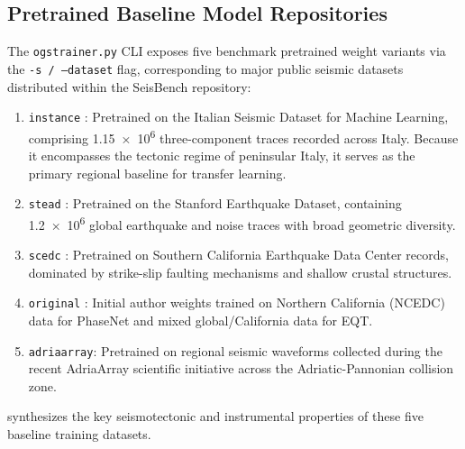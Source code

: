 \subsection{Pretrained Baseline Model Repositories}
\label{subsec:pretrained_repositories}

The \texttt{ogstrainer.py} CLI exposes five benchmark pretrained
weight variants
via the \texttt{-s / --dataset} flag, corresponding to major public seismic
datasets distributed within the SeisBench repository:
\begin{enumerate}
  \item \texttt{instance} \parencite{INSTANCE}: Pretrained on the
    Italian Seismic
    Dataset for Machine Learning, comprising \num{1.15e6} three-component
    traces recorded across Italy. Because it encompasses the tectonic regime of
    peninsular Italy, it serves as the primary regional baseline for
    transfer learning.
  \item \texttt{stead} \parencite{STEAD}: Pretrained on the Stanford Earthquake
    Dataset, containing \num{1.2e6} global earthquake and
    noise traces with
    broad geometric diversity.
  \item \texttt{scedc} \parencite{SCEDC}: Pretrained on Southern
    California Earthquake
    Data Center records, dominated by strike-slip faulting
    mechanisms and shallow
    crustal structures.
  \item \texttt{original} \parencite{PhaseNet,EQTransformer}: Initial
    author weights
    trained on Northern California (NCEDC) data for \ac{PhaseNet} and
    mixed global/California
    data for \ac{EQT}.
  \item \texttt{adriaarray}: Pretrained on regional seismic waveforms collected
    during the recent AdriaArray scientific initiative across the
    Adriatic-Pannonian
    collision zone.
\end{enumerate}

 synthesizes the key
seismotectonic
and instrumental properties of these five baseline training datasets.

